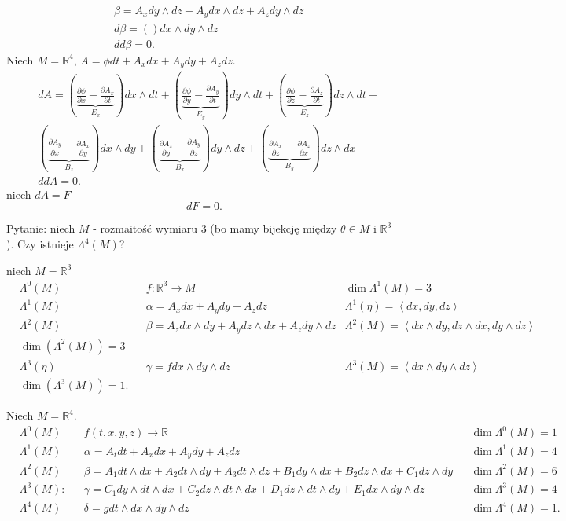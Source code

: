 \documentclass[../main.tex]{subfiles}
\begin{document}
\begin{align*}
    &\beta = A_xdy\land dz + A_ydx\land dz + A_zdy\land dz\\
    &d\beta = \left(  \right) dx\land dy\land dz\\
    &dd\beta = 0
.\end{align*}
Niech $M = \mathbb{R}^4$, $A = \phi dt + A_x dx + A_y dy + A_z dz$.
\begin{align*}
    &dA = \left( \underbrace{\frac{\partial \phi}{\partial x} - \frac{\partial A_x}{\partial t}}_{E_x}  \right) dx\land dt + \left( \underbrace{\frac{\partial \phi}{\partial y} - \frac{\partial A_y}{\partial t}}_{E_y}  \right) dy\land dt + \left( \underbrace{\frac{\partial \phi}{\partial z}  - \frac{\partial A_z}{\partial t}}_{E_z} \right) dz\land dt+\\
    &\left( \underbrace{\frac{\partial A_y}{\partial x} - \frac{\partial A_x}{\partial y} }_{B_z} \right) dx\land dy + \left( \underbrace{\frac{\partial A_z}{\partial y} - \frac{\partial A_y}{\partial z}}_{B_x}  \right) dy\land dz + \left( \underbrace{\frac{\partial A_x}{\partial z} - \frac{\partial A_z}{\partial x}}_{B_y}  \right) dz\land dx\\
    &ddA = 0
.\end{align*}
niech $dA = F$
\[
dF = 0
.\]

Pytanie: niech $M$ - rozmaitość wymiaru $3$ (bo mamy bijekcję między $\theta\in M$ i $\mathbb{R}^3$ ). Czy istnieje $\Lambda^4(M)$?

niech $M = \mathbb{R}^3$
\begin{align*}
    &\Lambda^0(M) &&f: \mathbb{R}^3\to M &\dim \Lambda^1(M) = 3\\
    &\Lambda^1(M) &&\alpha = A_xdx + A_ydy + A_zdz &\Lambda^1(\eta) = \left<dx,dy,dz \right>\\
    &\Lambda^2(M) &&\beta = A_zdx\land dy + A_ydz\land dx + A_z dy \land dz & \Lambda^2(M) = \left<dx\land dy, dz\land dx, dy\land dz \right>\\
    &\dim(\Lambda^2(M)) = 3\\
    &\Lambda^3(\eta) &&\gamma = f dx\land dy \land dz & \Lambda^3(M) = \left<dx\land dy\land dz \right>\\
    &\dim(\Lambda^3(M)) = 1
.\end{align*}

Niech $M = \mathbb{R}^4$.
\begin{align*}
    &\Lambda^0(M) &&f(t,x,y,z) \to \mathbb{R} &&\dim \Lambda^0(M) =1\\
    &\Lambda^1(M) &&\alpha = A_t dt + A_xdx + A_ydy + A_zdz &&\dim \Lambda^1(M) = 4\\
    &\Lambda^2(M) &&\beta = A_1 dt\land dx+A_2dt\land dy + A_3dt\land dz + B_1dy\land dx + B_2 dz\land dx + C_1dz\land dy &&\dim \Lambda^2(M) = 6\\
    &\Lambda^3(M): &&\gamma = C_1dy\land dt\land dx + C_2dz\land dt\land dx + D_1dz\land dt\land dy + E_1dx\land dy\land dz &&\dim \Lambda^3(M) = 4\\
    &\Lambda^4(M) &&\delta = gdt\land dx\land dy\land dz && \dim\Lambda^4(M) = 1
.\end{align*}
\end{document}
